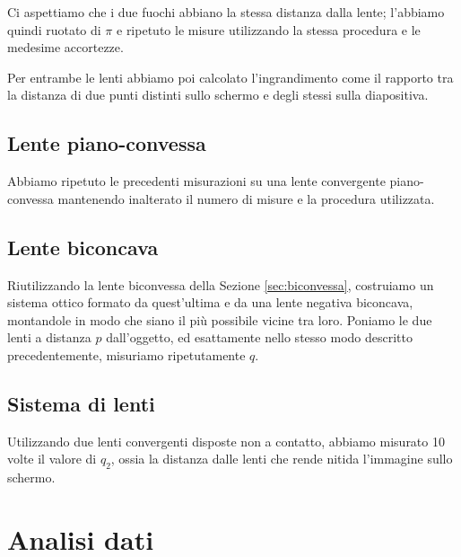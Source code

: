 \documentclass[a4paper]{article}
\begin{document}
        Ci aspettiamo che i due fuochi abbiano la stessa distanza dalla lente; l'abbiamo quindi ruotato di $\pi$ e ripetuto le misure utilizzando la stessa procedura e le medesime accortezze.

        Per entrambe le lenti abbiamo poi calcolato l'ingrandimento come il rapporto tra la distanza di due punti distinti sullo schermo e degli stessi sulla diapositiva.
        
    \subsection{Lente piano-convessa}    
    Abbiamo ripetuto le precedenti misurazioni su una lente convergente piano-convessa mantenendo inalterato il numero di misure e la procedura utilizzata.
    
    \subsection{Lente biconcava}
    Riutilizzando la lente biconvessa della Sezione \ref{sec:biconvessa}, costruiamo un sistema ottico formato da quest'ultima e da una lente negativa biconcava, montandole in modo che siano il più possibile vicine tra loro. Poniamo le due lenti a distanza $p$ dall'oggetto, ed esattamente nello stesso modo descritto precedentemente, misuriamo ripetutamente $q$.
    
    \subsection{Sistema di lenti}
    Utilizzando due lenti convergenti disposte non a contatto, abbiamo misurato 10 volte il valore di $q_2$, ossia la distanza dalle lenti che rende nitida l'immagine sullo schermo.
\section{Analisi dati}
\end{document}
